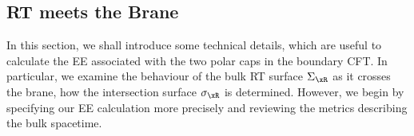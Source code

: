 %
%
%
%
%
%

\subsection{RT meets the Brane}
\label{sec:enzyme}
%
In this section, we shall introduce some technical details, which are useful to calculate the EE associated with the two polar caps in the boundary CFT. In particular, we examine the behaviour of the bulk RT surface $\Sigma_\xR$ as it crosses the brane, \ie how the intersection surface $\sigma_\xR$ is determined.
However, we begin by specifying our EE calculation more precisely and reviewing the metrics describing the bulk spacetime.

